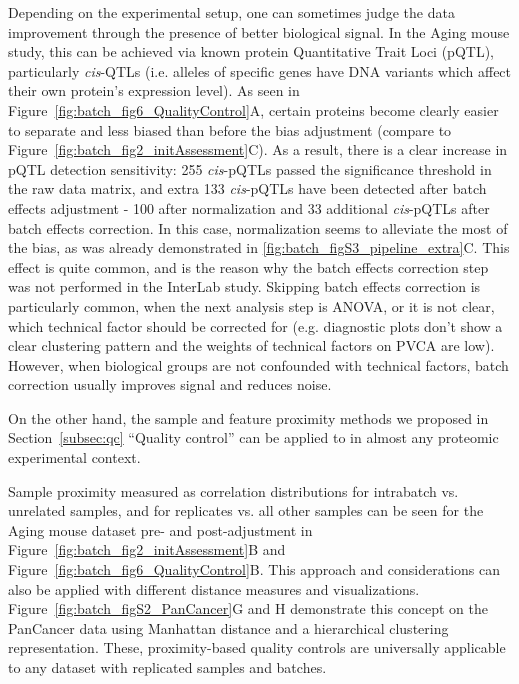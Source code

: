 \documentclass[num-refs]{wiley-article}
\begin{document}
Depending on the experimental setup, one can sometimes judge the data improvement through the presence of better biological signal. In the Aging mouse study, this can be achieved via known protein Quantitative Trait Loci (pQTL), particularly \textit{cis}-QTLs (i.e. alleles of specific genes have DNA variants which affect their own protein's expression level). As seen in Figure~\ref{fig:batch_fig6_QualityControl}A, certain proteins become clearly easier to separate and less biased than before the bias adjustment (compare to Figure~\ref{fig:batch_fig2_initAssessment}C). As a result, there is a clear increase in pQTL detection sensitivity: 255 \textit{cis}-pQTLs passed the significance threshold in the raw data matrix, and extra 133 \textit{cis}-pQTLs have been detected after batch effects adjustment - 100 after normalization and 33 additional \textit{cis}-pQTLs after batch effects correction. In this case, normalization seems to alleviate the most of the bias, as was already demonstrated in \ref{fig:batch_figS3_pipeline_extra}C. This effect is quite common, and is the reason why the batch effects correction step was not performed in the InterLab study. Skipping batch effects correction is particularly common, when the next analysis step is ANOVA, or it is not clear, which technical factor should be corrected for (e.g. diagnostic plots don't show a clear clustering pattern and the weights of technical factors on PVCA are low).  However, when biological groups are not confounded with technical factors, batch correction usually improves signal and reduces noise.

On the other hand, the sample and feature proximity methods we proposed in Section~\ref{subsec:qc} “Quality control” can be applied to in almost any proteomic experimental context.

Sample proximity measured as correlation distributions for intrabatch vs. unrelated samples, and for replicates vs. all other samples can be seen for the Aging mouse dataset pre- and post-adjustment in Figure~\ref{fig:batch_fig2_initAssessment}B and Figure~\ref{fig:batch_fig6_QualityControl}B. This approach and considerations can also be applied with different distance measures and visualizations. Figure~\ref{fig:batch_figS2_PanCancer}G and H demonstrate this concept on the PanCancer data using Manhattan distance and a hierarchical clustering representation. These, proximity-based quality controls are universally applicable to any dataset with replicated samples and batches.
\end{document}
